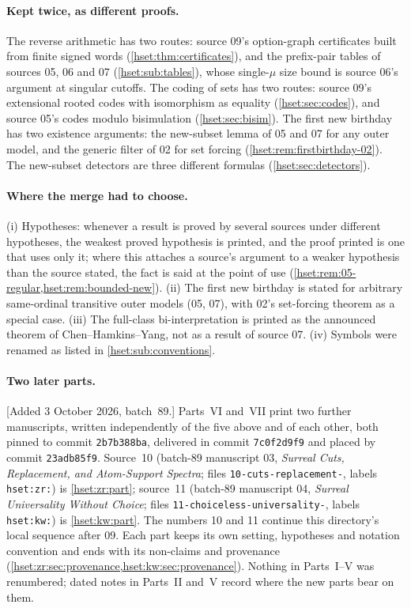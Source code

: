 \documentclass[11pt,letterpaper]{article}
\theoremstyle{definition}
\theoremstyle{remark}
\begin{document}
\paragraph{Kept twice, as different proofs.} The reverse arithmetic has two
routes: source 09's option-graph certificates built from finite signed words
(\cref{hset:thm:certificates}), and the prefix-pair tables of sources 05, 06 and
07 (\cref{hset:sub:tables}), whose single-$\mu$ size bound is source 06's
argument at singular cutoffs. The coding of sets has two routes: source 09's
extensional rooted codes with isomorphism as equality (\cref{hset:sec:codes}),
and source 05's codes modulo bisimulation (\cref{hset:sec:bisim}). The first new
birthday has two existence arguments: the new-subset lemma of 05 and 07 for any
outer model, and the generic filter of 02 for set forcing
(\cref{hset:rem:firstbirthday-02}). The new-subset detectors are three different
formulas (\cref{hset:sec:detectors}).

\paragraph{Where the merge had to choose.}
(i) Hypotheses: whenever a result is proved by several sources under different
hypotheses, the weakest proved hypothesis is printed, and the proof printed is
one that uses only it; where this attaches a source's argument to a weaker
hypothesis than the source stated, the fact is said at the point of use
(\cref{hset:rem:05-regular,hset:rem:bounded-new}). (ii) The first new birthday
is stated for arbitrary same-ordinal transitive outer models (05, 07), with
02's set-forcing theorem as a special case. (iii) The full-class
bi-interpretation is printed as the announced theorem of Chen--Hamkins--Yang,
not as a result of source 07. (iv) Symbols were renamed as listed in
\cref{hset:sub:conventions}.

\paragraph{Two later parts.} [Added 3 October 2026, batch~89.] Parts~VI and~VII
print two further manuscripts, written independently of the five above and of
each other, both pinned to commit \texttt{2b7b388ba}, delivered in commit
\texttt{7c0f2d9f9} and placed by commit \texttt{23adb85f9}. Source~10
(batch-89 manuscript 03, \emph{Surreal Cuts, Replacement, and Atom-Support
Spectra}; files \texttt{10-cuts-replacement-}, labels \texttt{hset:zr:}) is
\cref{hset:zr:part}; source~11 (batch-89 manuscript 04, \emph{Surreal
Universality Without Choice}; files \texttt{11-choiceless-universality-},
labels \texttt{hset:kw:}) is \cref{hset:kw:part}. The numbers 10 and 11
continue this directory's local sequence after 09. Each part keeps its own
setting, hypotheses and notation convention and ends with its non-claims and
provenance (\cref{hset:zr:sec:provenance,hset:kw:sec:provenance}). Nothing in
Parts~I--V was renumbered; dated notes in Parts~II and~V record where the new
parts bear on them.
\end{document}
